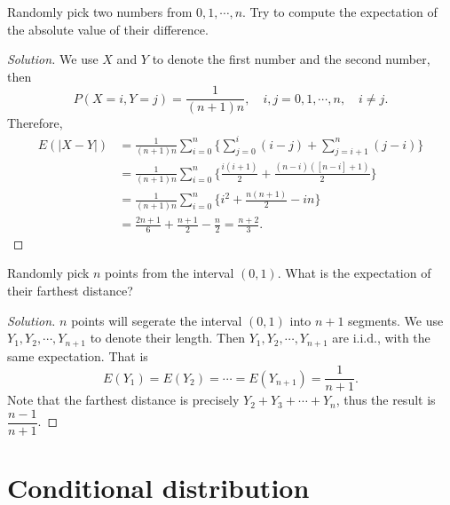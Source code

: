 \documentclass[11pt,singlecolumn, openany, citestyle=authoryear]{elegantbook}
\begin{document}
\begin{CJK}{UTF8}{gbsn}
\begin{exercise}
    Randomly pick two numbers from $0,1,\cdots,n$. Try to compute the expectation of 
    the absolute value of their difference.  
\end{exercise}
\begin{proof}[Solution]
    We use $X$ and $Y$ to denote the first number and the second number, then 
    $$
    P(X=i,Y=j)=\frac{1}{(n+1)n},\quad i,j=0,1,\cdots,n,\quad i \neq j.
    $$
    Therefore,
    \begin{align*}
        E(|X-Y|)&=\frac{1}{(n+1)n}\sum_{i=0}^n \bigg\{ 
        \sum_{j=0}^i (i-j)+\sum_{j=i+1}^n (j-i)    
        \bigg\}\\
        &= \frac{1}{(n+1)n}\sum_{i=0}^n \bigg\{ 
            \frac{i(i+1)}{2}+\frac{(n-i)([n-i]+1)}{2}   
            \bigg\}\\
        &= \frac{1}{(n+1)n}\sum_{i=0}^n \bigg\{ 
            i^2+\frac{n(n+1)}{2}-in    
            \bigg\}\\
        &= \frac{2n+1}{6}+\frac{n+1}{2}-\frac{n}{2}=\frac{n+2}{3}.
    \end{align*}
\end{proof}

\begin{exercise}
    Randomly pick $n$ points from the interval $(0,1)$. What is the expectation of their 
    farthest distance?
\end{exercise}
\begin{proof}[Solution]
    $n$ points will segerate the interval $(0,1)$ into $n+1$ segments. We use 
    $Y_1,Y_2,\cdots,Y_{n+1}$ to denote their length. Then $Y_1,Y_2,\cdots,Y_{n+1}$ are 
    i.i.d., with the same expectation. That is 
    $$
    E(Y_1)=E(Y_2)=\cdots=E(Y_{n+1})=\frac{1}{n+1}.
    $$
    Note that the farthest distance is precisely $Y_2+Y_3+\cdots+Y_n$, thus the result is 
    $\dfrac{n-1}{n+1}$.
\end{proof}

\section{Conditional distribution}

\end{CJK}
\end{document}
